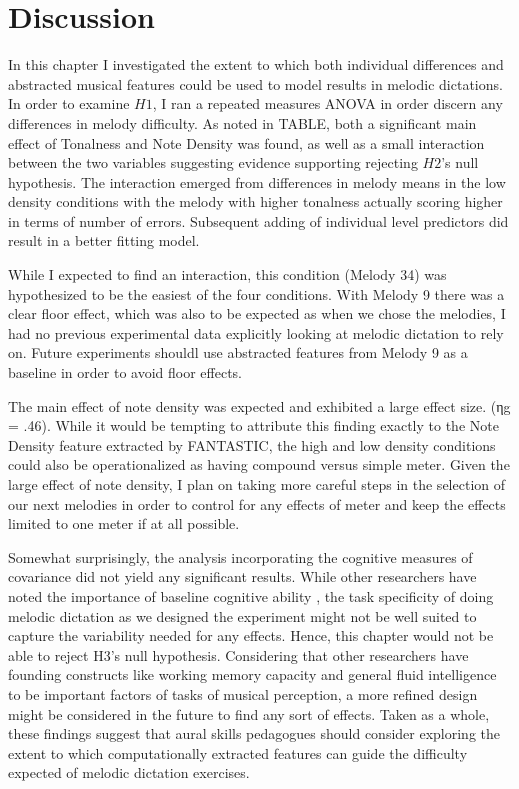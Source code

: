 \documentclass[]{book}
\begin{document}
\hypertarget{discussion-2}{%
\section{Discussion}\label{discussion-2}}

In this chapter I investigated the extent to which both individual differences and abstracted musical features could be used to model results in melodic dictations.
In order to examine \(H1\), I ran a repeated measures ANOVA in order discern any differences in melody difficulty.
As noted in TABLE, both a significant main effect of Tonalness and Note Density was found, as well as a small interaction between the two variables suggesting evidence supporting rejecting \(H2\)'s null hypothesis.
The interaction emerged from differences in melody means in the low density conditions with the melody with higher tonalness actually scoring higher in terms of number of errors.
Subsequent adding of individual level predictors did result in a better fitting model.

While I expected to find an interaction, this condition (Melody 34) was hypothesized to be the easiest of the four
conditions.
With Melody 9 there was a clear floor effect, which was also to be expected as when we chose the melodies, I had no previous experimental data explicitly looking at melodic dictation to rely on.
Future experiments shouldl use abstracted features from Melody 9 as a baseline in order to avoid floor effects.

The main effect of note density was expected and exhibited a large effect size. (ηg = .46).
While it would be tempting to attribute this finding exactly to the Note Density feature extracted by FANTASTIC, the high and low density conditions could also be operationalized as having compound versus simple meter.
Given the large effect of note density, I plan on taking more careful steps in the selection of our next melodies in order to control for any effects of meter and keep the effects limited to one meter if at all possible.

Somewhat surprisingly, the analysis incorporating the cognitive measures of covariance did not yield any significant
results.
While other researchers have noted the importance of baseline cognitive ability \citep{schellenbergMusicCognitiveAbilities2013}, the task specificity of doing melodic dictation as we designed the experiment might not be well suited to capture the variability needed for any effects.
Hence, this chapter would not be able to reject H3's null hypothesis.
Considering that other researchers have founding constructs like working memory capacity and general fluid intelligence to be important factors of tasks of musical perception, a more refined design might be considered in the future to find any sort of effects.
Taken as a whole, these findings suggest that aural skills pedagogues should consider exploring the extent to which computationally extracted features can guide the difficulty expected of melodic dictation exercises.
\end{document}
